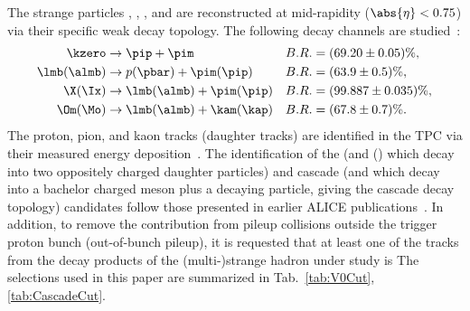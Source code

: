 \documentclass[ALICE,manyauthors]{cernphprep}
\begin{document}
The strange particles \kzero, \lmb, \almb, \Xis and \Oms are reconstructed at mid-rapidity ($\abs{\eta} < 0.75$) via their specific weak decay topology.
The following decay channels are studied~\cite{PhysRevD.98.030001}:
$$
\begin{aligned}
\kzero      & \to \pip + \pim               & B.R. & = (69.20 \pm 0.05) \%, \\
\lmb (\almb) & \to p(\pbar) + \pim (\pip)    & B.R. & = (63.9  \pm 0.5)  \%, \\
\X (\Ix)    & \to \lmb (\almb) + \pim (\pip) & B.R. & = (99.887 \pm 0.035) \%, \\
\Om (\Mo)   & \to \lmb (\almb) + \kam (\kap) & B.R. & = (67.8  \pm 0.7)  \%. \\
\end{aligned}
$$
The proton, pion, and kaon tracks (daughter tracks) are identified in the TPC via their measured energy deposition~\cite{Abelev:2014ffa}.
The identification of the \Vzero (\kzero and \lmb (\almb) which decay into two oppositely charged daughter particles) and cascade (\Xis and \Oms which decay into a bachelor charged meson plus a \Vzero decaying particle, giving the cascade decay topology) candidates follow those presented in earlier ALICE publications~\cite{Aamodt:2011zza, Abelev:2012jp, Acharya:2018orn, Abelev:2013haa, Acharya:2020uxl, Acharya:2019kyh}.
In addition, to remove the contribution from pileup collisions outside the trigger proton bunch (out-of-bunch pileup), it is requested that at least one of the tracks from the decay products of the (multi-)strange hadron under study is 
The selections used in this paper are summarized in Tab.~\ref{tab:V0Cut}, \ref{tab:CascadeCut}.
\end{document}

